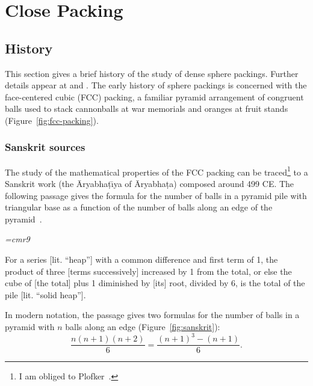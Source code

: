 

\chapter{Close Packing}\label{sec:close}

\section{History}\label{sec:history}

This section gives a brief history of the study of dense sphere
packings.  Further details appear at \cite{Szpiro} and
\cite{Hales:2006:overview}.
The early history of sphere packings is concerned with the
face-centered cubic (FCC) packing, a familiar pyramid arrangement
of congruent balls used to stack cannonballs at war memorials and
oranges at fruit stands (Figure~\ref{fig:fcc-packing}).

\figDHQRILO %


\subsection{Sanskrit sources}



The study of the mathematical properties of the FCC
packing can be traced\footnote{I am obliged to Plofker~\cite{Plo00}.} to a Sanskrit work (the \=Aryabha\d t\={\i}ya
 of \=Aryabha\d ta) composed around 499 CE.  The following passage gives
the formula for the number of balls in a pyramid pile with triangular base as
a function of the number of balls along an edge of the pyramid~\cite{Ary}.


\bigskip

{\narrower\it\font\ninerm=cmr9

For a series [lit. ``heap''] with a common difference and
  first term of 1, the product of three [terms successively] increased
  by 1 from the total, or else the cube of [the total] plus 1
  diminished by [its] root, divided by 6, is the total of the pile
  [lit. ``solid heap''].  

}

\bigskip

 In modern notation, the passage gives two formulas for the number of
 balls in a pyramid with $n$ balls along an edge (Figure~\ref{fig:sanskrit}):
\begin{equation}\label{eqn:sanskrit}
\dfrac{n(n+1)(n+2)}{6} =  \dfrac{(n+1)^3 - (n+1)}{6}.
\end{equation}

